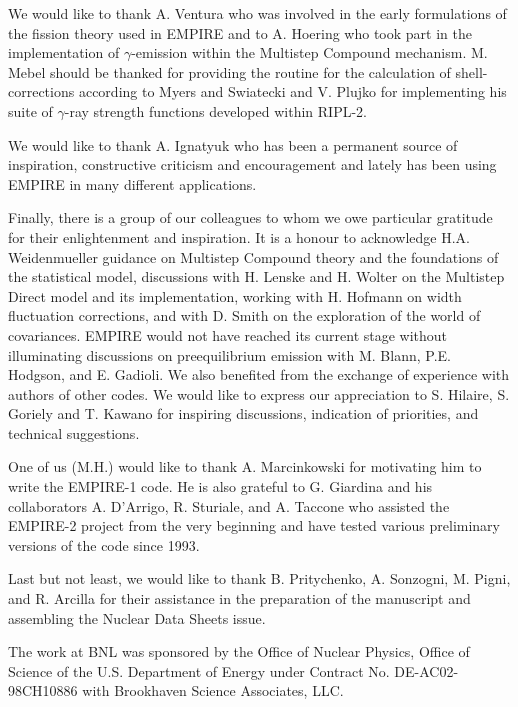 We would like to thank A. Ventura who was involved in the early formulations
of the fission theory used in EMPIRE and to A. Hoering who took part in the
implementation of $\gamma $-emission within the Multistep Compound
mechanism. M. Mebel should be thanked for providing the routine for the
calculation of shell-corrections according to Myers and Swiatecki and V.
Plujko for implementing his suite of $\gamma $-ray strength functions
developed within RIPL-2.

We would like to thank A. Ignatyuk who has been a permanent source of
inspiration, constructive criticism and encouragement and lately has been
using EMPIRE in many different applications.

Finally, there is a group of our colleagues to whom we owe particular
gratitude for their enlightenment and inspiration. It is a honour to
acknowledge H.A. Weidenmueller guidance on Multistep Compound theory and
the foundations of the statistical model, discussions with H. Lenske and H.
Wolter on the Multistep Direct model and its implementation,
working with H. Hofmann on width fluctuation corrections,
and with D. Smith on the exploration of the world of
covariances. EMPIRE would not have reached its current stage without
illuminating discussions on preequilibrium emission with M. Blann, P.E.
Hodgson, and E. Gadioli. We also benefited from the exchange of experience
with authors of other codes. We would like to express our appreciation to
S. Hilaire, S. Goriely and T. Kawano
for inspiring discussions, indication of priorities, and technical
suggestions.

One of us (M.H.) would like to thank A. Marcinkowski for motivating him to
write the EMPIRE-1 code. He is also grateful to G. Giardina and his
collaborators A. D'Arrigo, R. Sturiale, and A. Taccone who assisted the
EMPIRE-2 project from the very beginning and have tested various preliminary
versions of the code since 1993.

Last but not least, we would like to thank B. Pritychenko, A. Sonzogni, M.
Pigni, and R. Arcilla for their assistance in the preparation of the
manuscript and assembling the Nuclear Data Sheets issue.

The work at BNL was sponsored by the Office of Nuclear Physics, Office of Science
of the U.S. Department of Energy under Contract No. DE-AC02-98CH10886 with
Brookhaven Science Associates, LLC.

% 




